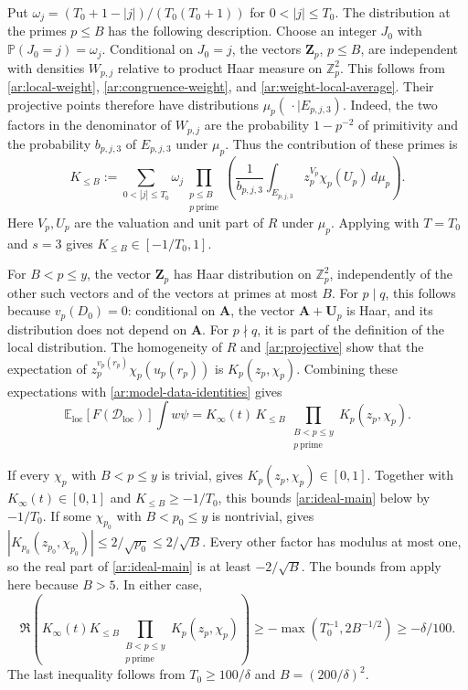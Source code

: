\documentclass[twoside]{aomart}
\theoremstyle{paperplain}
\theoremstyle{paperdefinition}
\newcommand{\E}{\mathbb E}
\newcommand{\Z}{\mathbb Z}
\newcommand{\Pp}{\mathbb P}
\numberwithin{equation}{section}
\begin{document}
Put $\omega_j=(T_0+1-|j|)/(T_0(T_0+1))$ for $0<|j|\le T_0$.
The distribution at the primes $p\le B$ has the following description.
Choose an integer $J_0$ with $\Pp(J_0=j)=\omega_j$.
Conditional on $J_0=j$, the vectors $\mathbf Z_p$, $p\le B$, are
independent with densities $W_{p,j}$ relative to product Haar measure
on $\Z_p^2$. This follows from \eqref{ar:local-weight},
\eqref{ar:congruence-weight}, and \eqref{ar:weight-local-average}.
Their projective points therefore have distributions
$\mu_p(\,\cdot\mid E_{p,j,3})$.
Indeed, the two factors in the denominator of $W_{p,j}$ are the
probability $1-p^{-2}$ of primitivity and the probability $b_{p,j,3}$
of $E_{p,j,3}$ under $\mu_p$.
Thus the contribution of these primes is
\begin{equation*}
 K_{\le B}
 :=\sum_{0<|j|\le T_0}\omega_j
   \prod_{\substack{p\le B\\p\ \mathrm{prime}}}\left(
       \frac1{b_{p,j,3}}
       \int_{E_{p,j,3}}z_p^{V_p}\chi_p(U_p)\,d\mu_p\right).
 \end{equation*}
Here $V_p,U_p$ are the valuation and unit part of $R$ under $\mu_p$.
Applying  with $T=T_0$ and $s=3$ gives
$K_{\le B}\in[-1/T_0,1]$.

For $B<p\le y$, the vector $\mathbf Z_p$ has Haar distribution on
$\Z_p^2$, independently of the other such vectors and of the vectors
at primes at most $B$.
For $p\mid q$, this follows because $v_p(D_0)=0$:
conditional on $\mathbf A$, the vector $\mathbf A+\mathbf U_p$ is
Haar, and its distribution does not depend on $\mathbf A$.
For $p\nmid q$, it is part of the definition of the local distribution.
The homogeneity of $R$ and \eqref{ar:projective} show that the
expectation of $z_p^{v_p(r_p)}\chi_p(u_p(r_p))$ is $K_p(z_p,\chi_p)$.
Combining these expectations with \eqref{ar:model-data-identities} gives
\begin{equation}
 \E_{\mathrm{loc}}[F(\mathcal D_{\mathrm{loc}})]\int w\psi
 =K_\infty(t)\,K_{\le B}\,
           \prod_{\substack{B<p\le y\\p\ \mathrm{prime}}}K_p(z_p,\chi_p).
 \label{ar:ideal-main}
\end{equation}

If every $\chi_p$ with $B<p\le y$ is trivial,
 gives $K_p(z_p,\chi_p)\in[0,1]$.
Together with $K_\infty(t)\in[0,1]$ and $K_{\le B}\ge-1/T_0$,
this bounds \eqref{ar:ideal-main} below by $-1/T_0$.
If some $\chi_{p_0}$ with $B<p_0\le y$ is nontrivial,
 gives
$|K_{p_0}(z_{p_0},\chi_{p_0})|\le2/\sqrt{p_0}\le2/\sqrt B$.
Every other factor has modulus at most one, so the real part of
\eqref{ar:ideal-main} is at least $-2/\sqrt B$.
The bounds from  apply here because $B>5$.
In either case,
\begin{equation}
 \Re\left(K_\infty(t)K_{\le B}
                  \prod_{\substack{B<p\le y\\p\ \mathrm{prime}}}K_p(z_p,\chi_p)\right)
 \ge-\max(T_0^{-1},2B^{-1/2})\ge-\delta/100.
 \label{ar:ideal-lower-bound}
\end{equation}
The last inequality follows from $T_0\ge100/\delta$ and
$B=(200/\delta)^2$.
\end{document}
